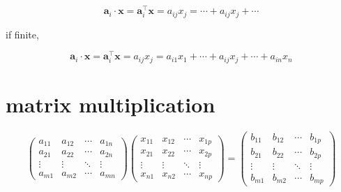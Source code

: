 \documentclass[
]{book}
\theoremstyle{definition}
\theoremstyle{definition}
\theoremstyle{definition}
\theoremstyle{definition}
\theoremstyle{remark}
\begin{document}
\[
\boldsymbol{a}_{{\scriptscriptstyle i}}\cdot\boldsymbol{x}=\boldsymbol{a}_{{\scriptscriptstyle i}}^{\intercal}\boldsymbol{x}=a_{{\scriptscriptstyle ij}}x_{{\scriptscriptstyle j}}=\cdots+a_{{\scriptscriptstyle ij}}x_{{\scriptscriptstyle j}}+\cdots
\]

if finite,

\[
\boldsymbol{a}_{{\scriptscriptstyle i}}\cdot\boldsymbol{x}=\boldsymbol{a}_{{\scriptscriptstyle i}}^{\intercal}\boldsymbol{x}=a_{{\scriptscriptstyle ij}}x_{{\scriptscriptstyle j}}=a_{{\scriptscriptstyle i1}}x_{{\scriptscriptstyle 1}}+\cdots+a_{{\scriptscriptstyle ij}}x_{{\scriptscriptstyle j}}+\cdots+a_{{\scriptscriptstyle in}}x_{{\scriptscriptstyle n}}
\]

\section{matrix multiplication}\label{matrix-multiplication}

\[
\begin{pmatrix}a_{{\scriptscriptstyle 11}} & a_{{\scriptscriptstyle 12}} & \cdots & a_{{\scriptscriptstyle 1n}}\\
a_{{\scriptscriptstyle 21}} & a_{{\scriptscriptstyle 22}} & \cdots & a_{{\scriptscriptstyle 2n}}\\
\vdots & \vdots & \ddots & \vdots\\
a_{{\scriptscriptstyle m1}} & a_{{\scriptscriptstyle m2}} & \cdots & a_{{\scriptscriptstyle mn}}
\end{pmatrix}\begin{pmatrix}x_{{\scriptscriptstyle 11}} & x_{{\scriptscriptstyle 12}} & \cdots & x_{{\scriptscriptstyle 1p}}\\
x_{{\scriptscriptstyle 21}} & x_{{\scriptscriptstyle 22}} & \cdots & x_{{\scriptscriptstyle 2p}}\\
\vdots & \vdots & \ddots & \vdots\\
x_{{\scriptscriptstyle n1}} & x_{{\scriptscriptstyle n2}} & \cdots & x_{{\scriptscriptstyle np}}
\end{pmatrix}=\begin{pmatrix}b_{{\scriptscriptstyle 11}} & b_{{\scriptscriptstyle 12}} & \cdots & b_{{\scriptscriptstyle 1p}}\\
b_{{\scriptscriptstyle 21}} & b_{{\scriptscriptstyle 22}} & \cdots & b_{{\scriptscriptstyle 2p}}\\
\vdots & \vdots & \ddots & \vdots\\
b_{{\scriptscriptstyle m1}} & b_{{\scriptscriptstyle m2}} & \cdots & b_{{\scriptscriptstyle mp}}
\end{pmatrix}
\]
\end{document}
